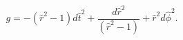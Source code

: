 \begin{equation}
g= -(\hat{r}^2-1)d\hat{t}^2 + \frac{d\hat{r}^2}{(\hat{r}^2-1)}
+\hat{r}^2d\hat{\phi}^2.
\end{equation}


